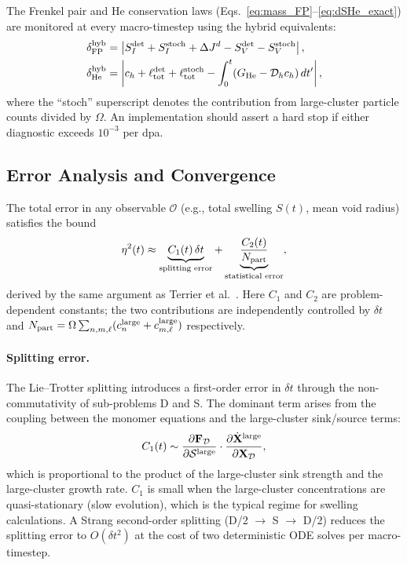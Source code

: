 The Frenkel pair and He conservation laws
(Eqs.~\ref{eq:mass_FP}--\ref{eq:dSHe_exact}) are monitored at
every macro-timestep using the hybrid equivalents:
\begin{align}
    \delta_{\rm FP}^{\rm hyb}
    &= \left|
         S_I^{\rm det} + S_I^{\rm stoch}
         + \Delta J^d
         - S_V^{\rm det} - S_V^{\rm stoch}
       \right|,
    \label{eq:hybrid_dFP}\\
    \delta_{\rm He}^{\rm hyb}
    &= \left|
         c_h + \ell_{\rm tot}^{\rm det} + \ell_{\rm tot}^{\rm stoch}
         - \int_0^t (G_{\rm He} - \mathcal{D}_h c_h)\,dt'
       \right|,
    \label{eq:hybrid_dHe}
\end{align}
where the ``stoch'' superscript denotes the contribution from
large-cluster particle counts divided by $\Omega$.  An
implementation should assert a hard stop if either diagnostic
exceeds $10^{-3}$ per dpa.

\subsection{Error Analysis and Convergence}
\label{sec:hybrid_error}

The total error in any observable $\mathcal{O}$ (e.g., total
swelling $S(t)$, mean void radius) satisfies the bound
\begin{equation}\label{eq:hybrid_error}
    \eta^2(t)
    \approx \underbrace{C_1(t)\,\delta t}_{\text{splitting error}}
    + \underbrace{\frac{C_2(t)}{N_{\rm part}}}_{\text{statistical error}},
\end{equation}
derived by the same argument as Terrier et al.~\cite{Terrier2017}.
Here $C_1$ and $C_2$ are problem-dependent constants; the two
contributions are independently controlled by $\delta t$ and
$N_{\rm part} = \Omega \sum_{n,m,\ell}(c_n^{\rm large} +
c_{m,\ell}^{\rm large})$ respectively.

\paragraph{Splitting error.}
The Lie--Trotter splitting introduces a first-order error in
$\delta t$ through the non-commutativity of sub-problems D and S.
The dominant term arises from the coupling between the monomer
equations and the large-cluster sink/source terms:
\begin{equation}\label{eq:splitting_error_estimate}
    C_1(t) \sim
    \frac{\partial \mathbf{F}_{\mathcal{D}}}{\partial \mathcal{S}^{\rm large}}
    \cdot
    \frac{\partial \dot{\mathbf{X}}^{\rm large}}{\partial \mathbf{X}_{\mathcal{D}}},
\end{equation}
which is proportional to the product of the large-cluster sink
strength and the large-cluster growth rate.  $C_1$ is small when
the large-cluster concentrations are quasi-stationary (slow
evolution), which is the typical regime for swelling calculations.
A Strang second-order splitting (D/2 $\to$ S $\to$ D/2) reduces
the splitting error to $O(\delta t^2)$ at the cost of two
deterministic ODE solves per macro-timestep.


